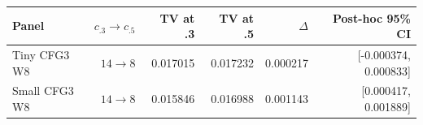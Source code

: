 {\small\setlength{\tabcolsep}{3pt}
\begin{tabular}{lrrrrr}
\hline
Panel & $c_{.3}\to c_{.5}$ & TV at .3 & TV at .5 & $\Delta$ & Post-hoc 95\% CI \\
\hline
Tiny CFG3 W8 & $14\to8$ & 0.017015 & 0.017232 & 0.000217 & [-0.000374, 0.000833] \\
Small CFG3 W8 & $14\to8$ & 0.015846 & 0.016988 & 0.001143 & [0.000417, 0.001889] \\
\hline
\end{tabular}
}
